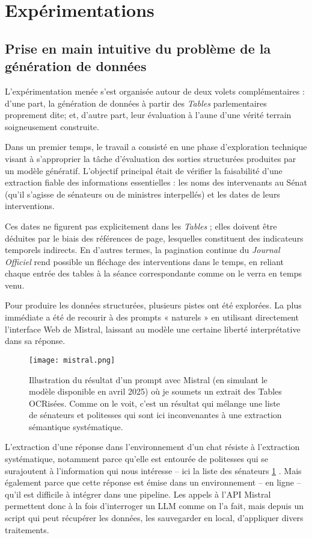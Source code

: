 \section{Expérimentations}

\subsection{Prise en main intuitive du problème de la génération de données}

L’expérimentation menée s’est organisée autour de deux volets complémentaires : d’une part, la génération de données à partir des \emph{Tables} parlementaires proprement dite; et, d’autre part, leur évaluation à l’aune d’une vérité terrain soigneusement construite.

Dans un premier temps, le travail a consisté en une phase d’exploration technique visant à s’approprier la tâche d’évaluation des sorties structurées produites par un modèle génératif. L’objectif principal était de vérifier la faisabilité d’une extraction fiable des informations essentielles : les noms des intervenants au Sénat (qu’il s’agisse de sénateurs ou de ministres interpellés) et les dates de leurs interventions.

Ces dates ne figurent pas explicitement dans les \emph{Tables} ; elles doivent être déduites par le biais des références de page, lesquelles constituent des indicateurs temporels indirects. En d’autres termes, la pagination continue du \emph{Journal Officiel} rend possible un fléchage des interventions dans le temps, en reliant chaque entrée des tables à la séance correspondante comme on le verra en temps venu.

Pour produire les données structurées, plusieurs pistes ont été explorées. La plus immédiate a été de recourir à des prompts « naturels » en utilisant directement l'interface Web de Mistral, laissant au modèle une certaine liberté interprétative dans sa réponse. 

\begin{figure}[htbp]
\centering
\texttt{[image: mistral.png]}
\caption{Illustration du résultat d'un prompt avec Mistral (en simulant le modèle disponible en avril 2025) où je soumets un extrait des Tables OCRisées. Comme on le voit, c'est un résultat qui mélange une liste de sénateurs et politesses qui sont ici inconvenantes à une extraction sémantique systématique.}
\label{fig:mistral}
\end{figure}

L'extraction d'une réponse dans l'environnement d'un chat résiste à l'extraction systématique, notamment parce qu'elle est entourée de politesses qui se surajoutent à l'information  qui nous intéresse -- ici la liste des sénateurs \ref{fig:mistral} . Mais également parce que cette réponse est émise dans un environnement -- en ligne -- qu'il est difficile à intégrer dans une pipeline. Les appels à l'API Mistral permettent donc à la fois d'interroger un LLM comme on l'a fait, mais depuis un script qui peut récupérer les données, les sauvegarder en local, d'appliquer divers traitements.


